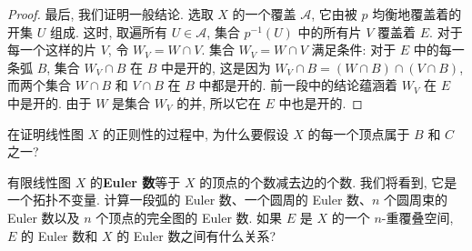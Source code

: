 \begin{proof}
最后, 我们证明一般结论. 选取 $X$ 的一个覆盖 $\mathcal{A}$, 它由被 $p$ 均衡地覆盖着的开集 $U$ 组成. 这时, 取遍所有 $U\in\mathcal{A}$, 集合 $p^{-1}(U)$ 中的所有片 $V$ 覆盖着 $E$. 对于每一个这样的片 $V$, 令 $W_{V}=W\cap V$. 集合 $W_{V}=W\cap V$ 满足条件: 对于 $E$ 中的每一条弧 $B$, 集合 $W_{V}\cap B$ 在 $B$ 中是开的, 这是因为 $W_{V}\cap B=(W\cap B)\cap(V\cap B)$, 而两个集合 $W\cap B$ 和 $V\cap B$ 在 $B$ 中都是开的. 前一段中的结论蕴涵着 $W_{V}$ 在 $E$ 中是开的. 由于 $W$ 是集合 $W_{V}$ 的并, 所以它在 $E$ 中也是开的.
\end{proof}

\begin{exercise}
\label{exercise:ch14-sec83-01}
在证明线性图 $X$ 的正则性的过程中, 为什么要假设 $X$ 的每一个顶点属于 $B$ 和 $C$ 之一?
\end{exercise}

\begin{exercise}
\label{exercise:ch14-sec83-02}
有限线性图 $X$ 的\textbf{Euler 数}等于 $X$ 的顶点的个数减去边的个数. 我们将看到, 它是一个拓扑不变量. 计算一段弧的 Euler 数、一个圆周的 Euler 数、$n$ 个圆周束的 Euler 数以及 $n$ 个顶点的完全图的 Euler 数. 如果 $E$ 是 $X$ 的一个 $n$-重覆叠空间, $E$ 的 Euler 数和 $X$ 的 Euler 数之间有什么关系?
\end{exercise}
